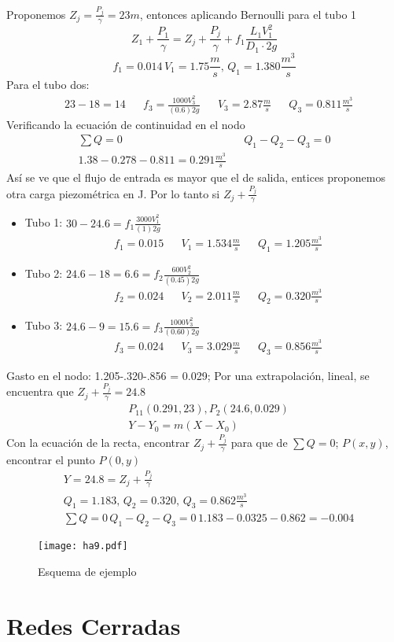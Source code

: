 Proponemos $Z_j=\frac{P_j}{\gamma}=23m$, entonces aplicando Bernoulli para el tubo 1
\begin{equation}
    Z_1 + \frac{P_1}{\gamma} = Z_j + \frac{P_j}{\gamma} + f_1\frac{L_1V_1^2}{D_1\cdot 2g}
\end{equation}
\begin{equation*}
    f_1 = 0.014\, V_1 = 1.75 \frac{m}{s},\, Q_1 = 1.380\frac{m^3}{s}
\end{equation*}
Para el tubo dos:
\begin{align*}
    &23 -18 =14&&f_3 =\frac{1000V_3^2}{(0.6)2g}&&V_3 =2.87\frac{m}{s}&&Q_3 = 0.811 \frac{m^3}{s}
\end{align*}
Verificando la ecuación de continuidad en el nodo
\begin{align*}
    \sum Q = 0&& Q_1 - Q_2 -Q_3 =0\\
    1.38 - 0.278 - 0.811 = 0.291 \frac{m^3}{s}
\end{align*}
Así se ve que el flujo de entrada es mayor que el de salida, entices proponemos otra carga piezométrica en J.
Por lo tanto si $Z_j+\frac{P_j}{\gamma}$
\begin{itemize}
    \item Tubo 1: $30-24.6=f_1\frac{3000V_1^2}{(1)2g}$
    \begin{align*}
        &f_1 = 0.015&&V_1 = 1.534 \frac{m}{s}&&Q_1 = 1.205 \frac{m^3}{s}
    \end{align*}
    \item Tubo 2: $24.6-18=6.6=f_2\frac{600V_2^2}{(0.45)2g}$
    \begin{align*}
        &f_2 = 0.024&&V_2 = 2.011 \frac{m}{s}&&Q_2 = 0.320 \frac{m^3}{s}
    \end{align*}
    \item Tubo 3: $24.6-9=15.6=f_3\frac{1000V_3^2}{(0.60)2g}$
    \begin{align*}
        &f_3 = 0.024&&V_3 = 3.029 \frac{m}{s}&&Q_3 = 0.856\frac{m^3}{s}
    \end{align*}
\end{itemize}
Gasto en el nodo: 1.205-.320-.856 = 0.029; Por una extrapolación, lineal, se encuentra que $Z_j+ \frac{P_j}{\gamma}=24.8$
\begin{align*}
    &P_11(0.291,23), P_2(24.6, 0.029)\\
    &Y - Y_0 = m(X - X_0) 
\end{align*}
Con la ecuación de la recta, encontrar $Z_j+ \frac{P_j}{\gamma}$ para que de $\sum Q=0$; $P(x,y)$, encontrar el punto $P(0,y)$
\begin{align*}
    &Y = 24.8 = Z_j+ \frac{P_j}{\gamma}\\
    &Q_1 = 1.183,\,Q_2 = 0.320,\,Q_3 = 0.862 \frac{m^3}{s}\\
    &\sum Q = 0\, Q_1 - Q_2 -Q_3 = 0\, 1.183 - 0.0325 - 0.862 =-0.004
\end{align*}
\begin{figure}[h!]
\centering
  \texttt{[image: ha9.pdf]}
  \caption{Esquema de ejemplo}
  \label{ha9}
\end{figure}\section{Redes Cerradas}
